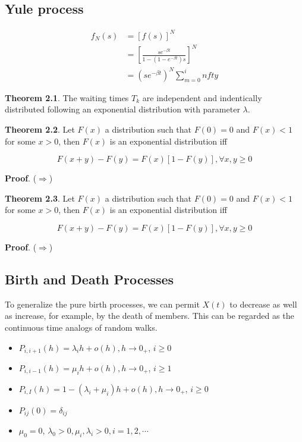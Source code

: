 \documentclass[12pt]{article}
\theoremstyle{nonumberbreak}
\begin{document}
\subsection{Yule process}



$$
\begin{aligned}
f_N(s) &= [f(s)]^N \\[8pt]
&= \left[ \frac{se^{-\beta t}}{1 - (1-e^{-\beta t})s} \right]^N \\[8pt]
&= (s e^{-\beta t})^N \sum_{m=0}^infty 
\end{aligned}
$$




\begin{theorem}
\textbf{Theorem 2.1}. The waiting times $T_k$ are independent and indentically distributed following an exponential distribution with parameter $\lambda$. 
\end{theorem}



\begin{theorem}
\textbf{Theorem 2.2}. Let $F(x)$ a distribution such that $F(0) = 0$ and $F(x) < 1$ for some $x >0 $, then $F(x)$ is an exponential distribution iff

$$
F(x+y) - F(y) = F(x)[1-F(y)], \forall x,y \ge 0
$$
\end{theorem}

\textbf{Proof}. ($\Rightarrow$) 




\begin{theorem}
\textbf{Theorem 2.3}. Let $F(x)$ a distribution such that $F(0) = 0$ and $F(x) < 1$ for some $x >0 $, then $F(x)$ is an exponential distribution iff

$$
F(x+y) - F(y) = F(x)[1-F(y)], \forall x,y \ge 0
$$
\end{theorem}

\textbf{Proof}. ($\Rightarrow$) 




\subsection{Birth and Death Processes}

To generalize the pure birth processes, we can permit $X(t)$ to decrease as well as increase, for example, by the death of members. This can be regarded as the continuous time analogs of random walks. 


\begin{itemize}
	\item $P_{i, i+1}(h) = \lambda_i h + o(h), h \to 0_+$, $i \ge 0$
	\item $P_{i, i-1}(h) = \mu_i h + o(h), h \to 0_+$, $i \ge 1$
	\item $P_{i,I} (h) = 1 -(\lambda_i + \mu_i) h + o(h), h \to 0_+$, $i \ge 0$
	\item $P_{ij} (0) = \delta_{ij}$
	\item $\mu_0 = 0$, $\lambda_0 > 0, \mu_i, \lambda_i > 0, i=1,2,\cdots$
\end{itemize}
\end{document}

